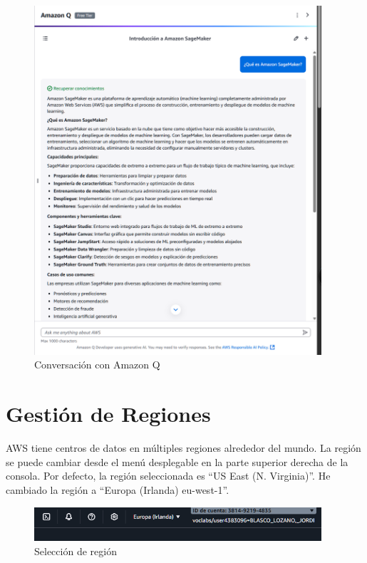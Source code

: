 \documentclass{article}
\begin{document}
	\begin{figure}[h!]
	\centering
	\includegraphics[width=0.95\textwidth]{tarea_6.png}
	\caption{Conversación con Amazon Q}
	\end{figure}

	\newpage

	\section{Gestión de Regiones}

	AWS tiene centros de datos en múltiples regiones alrededor del mundo. La región se puede cambiar desde el menú desplegable en la parte superior derecha de la consola. Por defecto, la región seleccionada es ``US East (N. Virginia)''. He cambiado la región a ``Europa (Irlanda) eu-west-1''.

	\begin{figure}[h!]
	\centering
	\includegraphics[width=0.95\textwidth]{tarea_7.png}
	\caption{Selección de región}
	\end{figure}
\end{document}
